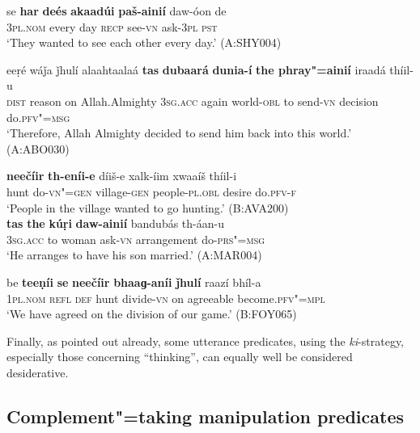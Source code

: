 \begin{exe}
\ex
\label{ex:13-173}
\gll se \textbf{har} \textbf{deés} \textbf{akaadúi} \textbf{paš-ainií} daw-óon de \\
\textsc{3pl.nom} every day \textsc{recp} see-\textsc{vn} ask-\textsc{3pl} \textsc{pst} \\
\glt `They wanted to see each other every day.' (A:SHY004)

\ex
\label{ex:13-174}
\gll eeṛé wáǰa ǰhulí alaahtaalaá \textbf{tas} \textbf{dubaará} \textbf{dunia-í} \textbf{ the phray"=ainií} iraadá thíil-u \\
\textsc{dist} reason on Allah.Almighty \textsc{3sg.acc} again world-\textsc{obl}  to send-\textsc{vn} decision do.\textsc{pfv"=msg}  \\
\glt `Therefore, Allah Almighty decided to send him back into this world.' (A:ABO030)

\ex
\label{ex:13-175}
\gll \textbf{neečíir} \textbf{th-eníi-e} díiš-e xalk-íim xwaaíš thíil-i \\
hunt do-\textsc{vn"=gen} village-\textsc{gen} people-\textsc{pl.obl} desire do.\textsc{pfv-f} \\
\glt `People in the village wanted to go hunting.' (B:AVA200) \\

\ex
\label{ex:13-176}
\gll \textbf{tas} \textbf{the} \textbf{kúṛi} \textbf{daw-ainií} bandubás th-áan-u \\
\textsc{3sg.acc} to woman ask-\textsc{vn}  arrangement do-\textsc{prs"=msg} \\
\glt `He arranges to have his son married.' (A:MAR004)

\ex
\label{ex:13-177}
\gll be \textbf{teeṇíi} \textbf{se} \textbf{neečíir} \textbf{bhaaɡ-aníi} \textbf{ǰhulí}  raazí bhíl-a \\
\textsc{1pl.nom} \textsc{refl} \textsc{def} hunt divide-\textsc{vn} on agreeable become.\textsc{pfv"=mpl} \\
\glt `We have agreed on the division of our game.' (B:FOY065) 
\end{exe}

Finally, as pointed out already, some utterance predicates, using the \textit{ki}-strategy, especially those concerning ``thinking'', can equally well be considered desiderative.


\subsection{Complement"=taking manipulation predicates}
\label{subsec:13-5-3}


